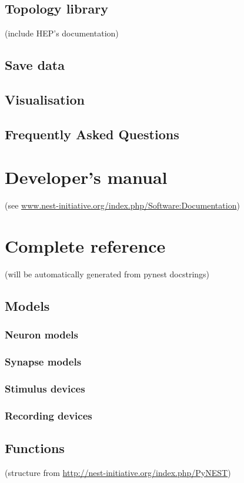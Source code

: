\documentclass[a4paper,10pt]{report}
\begin{document}
\section{Topology library}
(include HEP's documentation)
\section{Save data}
\section{Visualisation}
\section{Frequently Asked Questions}
\chapter{Developer's manual}

(see \href{http://nest-initiative.org/index.php/Software:Documentation}{www.nest-initiative.org/index.php/Software:Documentation})

\chapter{Complete reference}\label{chap:complete_reference}
(will be automatically generated from pynest docstrings)
\section{Models}
\subsection{Neuron models}
\subsection{Synapse models}
\subsection{Stimulus devices}
\subsection{Recording devices}
\section{Functions}
(structure from \href{ http://nest-initiative.org/index.php/PyNEST}{ http://nest-initiative.org/index.php/PyNEST})
\end{document}
